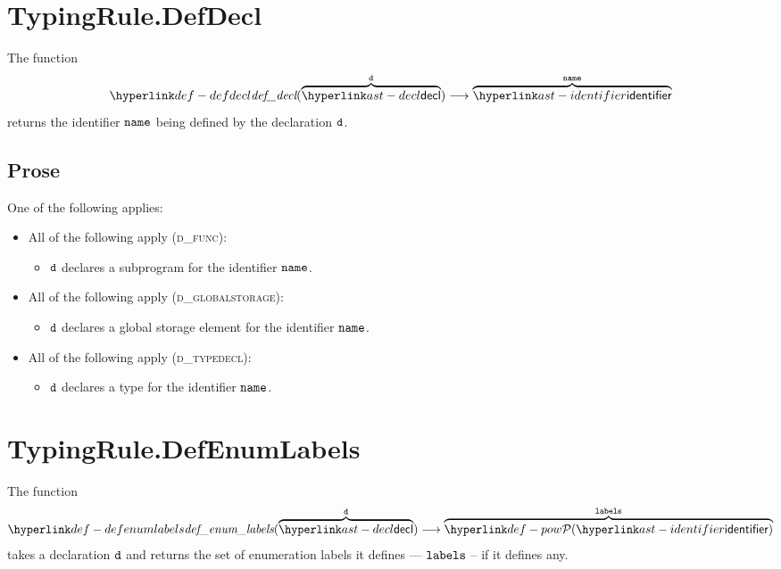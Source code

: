 \section{TypingRule.DefDecl \label{sec:TypingRule.DefDecl}}
\hypertarget{def-defdecl}{}
The function
\[
\defdecl(\overname{\decl}{\vd}) \aslto \overname{\identifier}{\name}
\]
returns the identifier $\texttt{name}$ being defined by the declaration $\texttt{d}$.

\subsection{Prose}
One of the following applies:
\begin{itemize}
  \item All of the following apply (\textsc{d\_func}):
  \begin{itemize}
    \item $\texttt{d}$ declares a subprogram for the identifier $\texttt{name}$.
  \end{itemize}

  \item All of the following apply (\textsc{d\_globalstorage}):
  \begin{itemize}
    \item $\texttt{d}$ declares a global storage element for the identifier $\texttt{name}$.
  \end{itemize}

  \item All of the following apply (\textsc{d\_typedecl}):
  \begin{itemize}
    \item $\texttt{d}$ declares a type for the identifier $\texttt{name}$.
  \end{itemize}
\end{itemize}


\section{TypingRule.DefEnumLabels \label{sec:TypingRule.DefEnumLabels}}
\hypertarget{def-defenumlabels}{}
The function
\[
\defenumlabels(\overname{\decl}{\vd}) \aslto \overname{\pow{\identifier}}{\vlabels}
\]
takes a declaration $\texttt{d}$ and returns the set of enumeration labels it defines --- $\texttt{labels}$ --
if it defines any.

